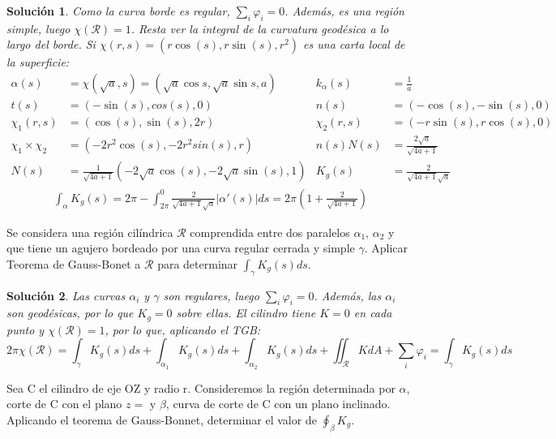 \documentclass[twoside]{report}
\theoremstyle{plain}
\newtheorem*{sol*}{Solución}
\newcommand{\X}{\chi}
\newenvironment{ejercicio}[2][Estado]{\begin{trivlist}
\item[\hskip \labelsep {\bfseries Ejercicio}\hskip \labelsep {\bfseries #2.}]}{\end{trivlist}}
\begin{document}
\begin{sol*}
Como la curva borde es regular, $\sum_i \varphi_i=0$. Además, es una región simple, luego $\chi(\mathcal{R})=1$. Resta ver la integral de la curvatura geodésica a lo largo del borde. Si $\X(r,s)=(r\cos(s),r\sin(s),r^2)$ es una carta local de la superficie:
\begin{align*}
\alpha(s)&=\X(\sqrt{a},s)=(\sqrt{a}\cos{s},\sqrt{a}\sin s,a)& k_\alpha(s)&=\frac{1}{a}\\
t(s)&=(-\sin(s),cos(s),0) & n(s)&=(-\cos(s),-\sin(s),0)\\
\X_1(r,s)& = (\cos(s),\sin(s),2r) & \X_2(r,s) &= (-r\sin(s),r\cos(s),0)\\
\X_1 \times \X_2 & = (-2 r^2 \cos(s), -2 r^2 sin(s), r) & n(s)N(s) &= \frac{2\sqrt{a}}{\sqrt{4a+1}} \\
N(s)& = \frac{1}{\sqrt{4a+1}}(-2\sqrt{a}\cos(s),-2\sqrt{a}\sin(s),1) & K_g(s) & = \frac{2}{\sqrt{4a+1}\sqrt{a}}
\end{align*}
\begin{gather*}
\int_\alpha K_g(s)= 2\pi - \int_{2\pi}^0 \frac{2}{\sqrt{4a+1}\sqrt{a}} |\alpha'(s)| ds =2\pi \left(1+\frac{2}{\sqrt{4a+1}}\right)
\end{gather*}
\end{sol*}
\newpage
\begin{ejercicio}{11} Se considera una región cilíndrica $\mathcal{R}$ comprendida entre dos paralelos $\alpha_1$, $\alpha_2$ y que tiene un agujero bordeado por una curva regular cerrada y simple $\gamma$. Aplicar Teorema de Gauss-Bonet a $\mathcal{R}$ para determinar $\int_\gamma K_g(s)ds$.
\end{ejercicio}
\begin{sol*}
Las curvas $\alpha_i$ y $\gamma$ son regulares, luego $\sum_i \varphi_i =0$. Además, las $\alpha_i$ son geodésicas, por lo que $K_g=0$ sobre ellas. El cilindro tiene $K=0$ en cada punto y $\chi(\mathcal{R})=1$, por lo que, aplicando el TGB:
\[
2\pi\chi(\mathcal{R}) = \int_\gamma K_g(s)ds + \int_{\alpha_1} K_g(s)ds + \int_{\alpha_2} K_g(s)ds+  \iint_{\mathcal{R}} KdA + \sum_i \varphi_i = \int_\gamma K_g(s)ds 
\]
\end{sol*}
\newpage
\begin{ejercicio}{13} Sea C el cilindro de eje OZ y radio r. Consideremos la región determinada por $\alpha$, corte de C con el plano $z=$ y $\beta$, curva de corte de C con un plano inclinado. Aplicando el teorema de Gauss-Bonnet, determinar el valor de $\oint_\beta K_g$.
\end{ejercicio}
\end{document}
